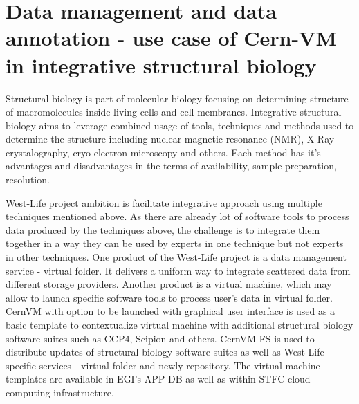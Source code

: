 \section{Data management and data annotation - use case of Cern-VM in integrative structural biology}

Structural biology is part of molecular biology focusing on determining structure of macromolecules inside living cells and cell membranes. Integrative structural biology aims to leverage combined usage of tools, techniques and methods used to determine the structure including nuclear magnetic resonance (NMR), X-Ray crystalography, cryo electron microscopy and others. Each method has it's advantages and disadvantages in the terms of availability, sample preparation, resolution. 

West-Life project ambition is facilitate integrative approach using multiple techniques mentioned above. As there are already lot of software tools to process data produced by the techniques above, the challenge is to integrate them together in a way they can be used by experts in one technique but not experts in other techniques. One product of the West-Life project is a data management service - virtual folder. It delivers a uniform way to integrate scattered data from different storage providers. Another product is a virtual machine, which may allow to launch specific software tools to process user's data in virtual folder. CernVM with option to be launched with graphical user interface is used as a basic template to contextualize virtual machine with additional structural biology software suites such as CCP4, Scipion and others. CernVM-FS is used to distribute updates of structural biology software suites as well as West-Life specific services - virtual folder and newly repository. The virtual machine templates are available in EGI's APP DB as well as within STFC cloud computing infrastructure.